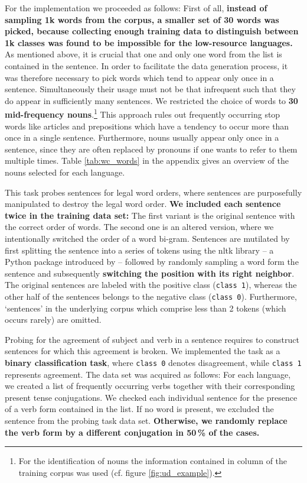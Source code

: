 For the implementation we proceeded as follows: First of all, \textbf{instead of sampling 1k words from the corpus, a smaller set of 30 words was picked, because collecting enough training data to distinguish between 1k classes was found to be impossible for the low-resource languages.} As mentioned above, it is crucial that one and only one word from the list is contained in the sentence. In order to facilitate the data generation process, it was therefore necessary to pick words which tend to appear only once in a sentence. Simultaneously their usage must not be that infrequent such that they do appear in sufficiently many sentences. We restricted the choice of words to \textbf{30 mid-frequency nouns}.\footnote{For the identification of nouns the information contained in column  of the training corpus was used (cf. figure \vref{fig:ud_example}).} This approach rules out frequently occurring stop words like articles and prepositions which have a tendency to occur more than once in a single sentence. Furthermore, nouns usually appear only once in a sentence, since they are often replaced by pronouns if one wants to refer to them multiple times. Table \vref{tab:wc_words} in the appendix gives an overview of the nouns selected for each language.

 This task probes sentences for legal word orders, where sentences are purposefully manipulated to destroy the legal word order. \textbf{We included each sentence twice in the training data set:} The first variant is the original sentence with the correct order of words. The second one is an altered version, where we intentionally switched the order of a word bi-gram. Sentences are mutilated by first splitting the sentence into a series of tokens using the \gls{nltk} library -- a Python package introduced by \citep{Bird.2002} -- followed by randomly sampling a word form the sentence and subsequently \textbf{switching the position with its right neighbor}. The original sentences are labeled with the positive class (\texttt{class 1}), whereas the other half of the sentences belongs to the negative class (\texttt{class 0}). Furthermore, `sentences' in the underlying corpus which comprise less than 2 tokens (which occurs rarely) are omitted.

 Probing for the agreement of subject and verb in a sentence requires to construct sentences for which this agreement is broken. We implemented the task as a \textbf{binary classification task}, where \texttt{class 0} denotes disagreement, while \texttt{class 1} represents agreement. The data set was acquired as follows: For each language, we created a list of frequently occurring verbs together with their corresponding present tense conjugations. We checked each individual sentence for the presence of a verb form contained in the list. If no word is present, we excluded the sentence from the probing task data set. \textbf{Otherwise, we randomly replace the verb form by a different conjugation in 50\,\% of the cases.}

